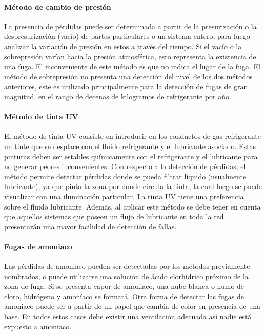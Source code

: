 	\paragraph{Método de cambio de presión}

	La presencia de pérdidas puede ser determinada a partir de la presurización o la despresurización (vacío) de partes particulares o un sistema entero, para luego analizar la variación de presión en estos a través del tiempo. Si el vacío o la sobrepresión varían hacia la presión atmosférica, esto representa la existencia de una fuga. El inconveniente de este método es que no indica el lugar de la fuga. El método de sobrepresión no presenta una detección del nivel de los dos métodos anteriores, este es utilizado principalmente para la detección de fugas de gran magnitud, en el rango de decenas de kilogramos de refrigerante por año.

	\paragraph{Método de tinta UV}

	El método de tinta UV consiste en introducir en los conductos de gas refrigerante un tinte que se desplace con el fluido refrigerante y el lubricante asociado. Estas pinturas deben ser estables químicamente con el refrigerante y el lubricante para no generar peores inconvenientes. Con respecto a la detección de pérdidas, el método permite detectar pérdidas donde se pueda filtrar líquido (usualmente lubricante), ya que pinta la zona por donde circula la tinta, la cual luego se puede visualizar con una iluminación particular. La tinta UV tiene una preferencia sobre el fluido lubricante. Además, al aplicar este método se debe tener en cuenta que aquellos sistemas que poseen un flujo de lubricante en toda la red presentarán una mayor facilidad de detección de fallas.

	\paragraph{Fugas de amoniaco}

	Las pérdidas de amoniaco pueden ser detectadas por los métodos previamente nombrados, o puede utilizarse una solución de ácido clorhídrico próximo de la zona de fuga. Si se presenta vapor de amoniaco, una nube blanca o humo de cloro, hidrógeno y amoníaco se formará. Otra forma de detectar las fugas de amoniaco puede ser a partir de un papel que cambia de color en presencia de una base. En todos estos casos debe existir una ventilación adecuada así nadie está expuesto a amoniaco. 


